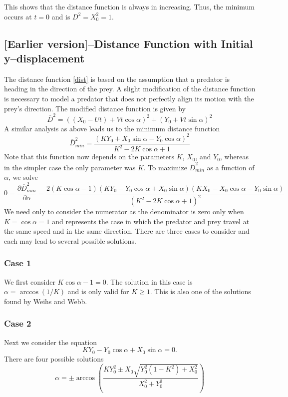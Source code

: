 \documentclass[12pt]{article}
\def\ds{\displaystyle}
\def\d{\partial}
\newcommand{\ol}{\overline}
\begin{document}
This shows that the distance function is always in increasing. Thus, the minimum occurs at $t=0$ and is $D^2 = X_0^2 = 1.$

\subsection{[Earlier version]--Distance Function with Initial y--displacement}
The distance function \eqref{dist} is based on the assumption that a predator is heading in the direction of the prey. A slight modification of the distance function is necessary to model a predator that does not perfectly align its motion with the prey's direction. The modified distance function is given by    
%
\begin{equation}
\ol D^2 = ((X_0 - Ut) + Vt\cos\alpha)^2 + (Y_0 + Vt\sin\alpha)^2
\label{y_dist}
\end{equation}
%
A similar analysis as above leads us to the minimum distance function
%
\begin{equation}
\ol D^2_{min}=\frac{(K Y_0+X_0 \sin \alpha -Y_0\cos \alpha)^2}{K^2-2 K \cos \alpha +1} 
\label{newDmin2}
\end{equation}
%
Note that this function now depends on the parameters $K$, $X_0$, and $Y_0$, whereas in the simpler case the only parameter was $K$. To maximize $\ol D^2_{min}$ as a function of $\alpha$, we solve
% 
\begin{equation}
0 = \frac{\d \ol D^2_{min}}{\d \alpha} = \frac{2(K \cos \alpha - 1)
	(K Y_0 - Y_0 \cos \alpha + X_0 \sin\alpha)(K X_0 - X_0 \cos \alpha - Y_0 \sin \alpha)}
	{(K^2 - 2K \cos \alpha + 1)^2}
\label{newDmin_dalpha}	
\end{equation}
%
We need only to consider the numerator as the denominator is zero only when $K = \cos \alpha = 1$ and represents the case in which the predator and prey travel at the same speed and in the same direction. There are three cases to consider and each may lead to several possible solutions.
% 
\subsubsection{Case 1}
We first consider $K \cos \alpha - 1=0$. The solution in this case is $\alpha = \arccos(1/K)$ and is only valid for $K\geq 1$. This is also one of the solutions found by Weihs and Webb.
%
\subsubsection{Case 2}
Next we consider the equation 
%
\begin{equation}
K Y_0 - Y_0 \cos \alpha + X_0 \sin\alpha = 0.
\end{equation}
%
There are four possible solutions 
%
\begin{equation}
\alpha = \pm \arccos \left( \frac{K Y_0^2 \pm X_0 
\ds\sqrt{Y_0^2(1- K^2) + X_0^2 }}{X_0^2+Y_0^2} \right )
\end{equation}
%	
\end{document}
